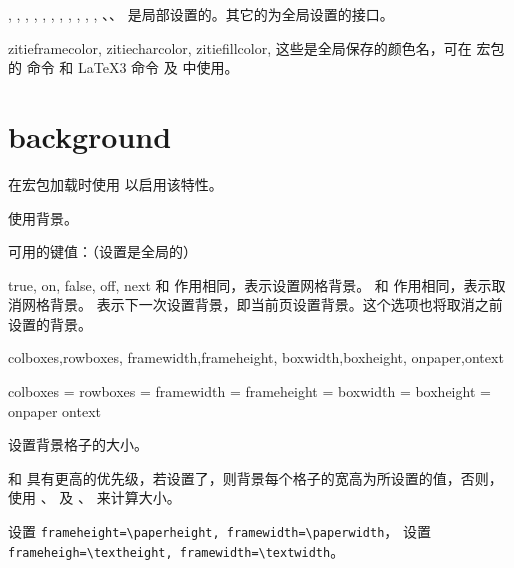 \documentclass{ctxdoc}
\begin{document}
\begin{function}{
  \zitiebasechar,
  \zitiebasecharwidth,
  \zitiebasecharheight,
  \zitiewidth,
  \zitieheight,
  \zitieboxwd,
  \zitieboxht,
  \zitieboxdp,
  \zitiefontname,
  \zitiexscaleratio,
  \zitieyscaleratio,
}
  、、 是局部设置的。其它的为全局设置的接口。
\end{function}

\begin{function}{
  zitieframecolor,
  zitiecharcolor,
  zitiefillcolor,
}
  这些是全局保存的颜色名，可在  宏包的  命令 和 \LaTeX3 命令  及  中使用。
\end{function}


\section{background}\label{sec:background}

在宏包加载时使用  以启用该特性。

\begin{function}{\zitiebackground}
  \begin{syntax}
     
  \end{syntax}
  使用背景。
\end{function}

 可用的键值：（设置是全局的）

\begin{function}{true, on, false, off, next}
   和  作用相同，表示设置网格背景。
   和  作用相同，表示取消网格背景。
   表示下一次设置背景，即当前页设置背景。这个选项也将取消之前设置的背景。
\end{function}

\begin{function}{
  colboxes,rowboxes,
  framewidth,frameheight,
  boxwidth,boxheight,
  onpaper,ontext
}
  \begin{syntax}
    colboxes    =  
    rowboxes    =  
    framewidth  = 
    frameheight = 
    boxwidth    = 
    boxheight   = 
    onpaper
    ontext
  \end{syntax}
  设置背景格子的大小。

   和  具有更高的优先级，若设置了，则背景每个格子的宽高为所设置的值，否则，使用 、 及 、 来计算大小。

   设置 \verb|frameheight=\paperheight, framewidth=\paperwidth|，
   设置 \verb|frameheigh=\textheight, framewidth=\textwidth|。
\end{function}
\end{document}

